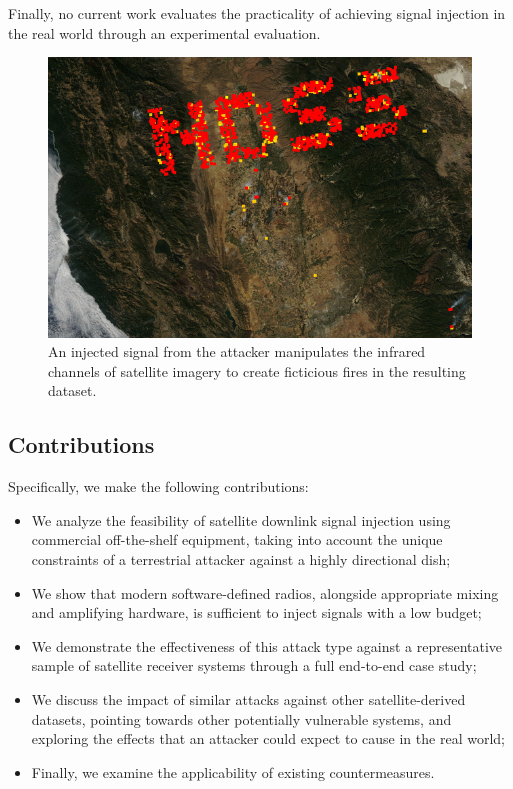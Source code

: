 Finally, no current work evaluates the practicality of achieving signal injection in the real world through an experimental evaluation.

\begin{figure}
    \includegraphics[width=\columnwidth]{diagrams/injection/pixels_800_140.jpg}
    \caption{An injected signal from the attacker manipulates the infrared channels of satellite imagery to create ficticious fires in the resulting dataset.}
    \label{fig:location-injection}
\end{figure}


\subsection{Contributions}

Specifically, we make the following contributions:

\begin{itemize}
    \item We analyze the feasibility of satellite downlink signal injection using commercial off-the-shelf equipment, taking into account the unique constraints of a terrestrial attacker against a highly directional dish;
    \item We show that modern software-defined radios, alongside appropriate mixing and amplifying hardware, is sufficient to inject signals with a low budget;
    \item We demonstrate the effectiveness of this attack type against a representative sample of satellite receiver systems through a full end-to-end case study;
    \item We discuss the impact of similar attacks against other satellite-derived datasets, pointing towards other potentially vulnerable systems, and exploring the effects that an attacker could expect to cause in the real world;
    \item Finally, we examine the applicability of existing countermeasures.
\end{itemize}
